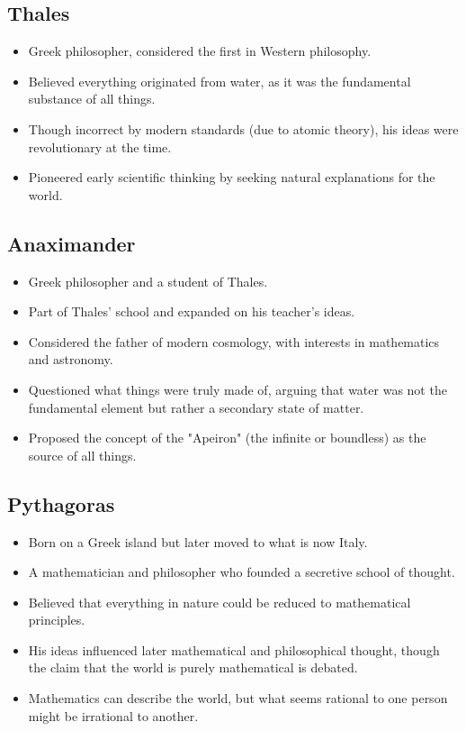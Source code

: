 
\subsection{Thales}

\begin{itemize}
    \item Greek philosopher, considered the first in Western philosophy.
    \item Believed everything originated from water, as it was the fundamental substance of all things.
    \item Though incorrect by modern standards (due to atomic theory), his ideas were revolutionary at the time.
    \item Pioneered early scientific thinking by seeking natural explanations for the world.
\end{itemize}

\subsection{Anaximander}

\begin{itemize}
    \item Greek philosopher and a student of Thales.
    \item Part of Thales' school and expanded on his teacher’s ideas.
    \item Considered the father of modern cosmology, with interests in mathematics and astronomy.
    \item Questioned what things were truly made of, arguing that water was not the fundamental element but rather a secondary state of matter.
    \item Proposed the concept of the "Apeiron" (the infinite or boundless) as the source of all things.
\end{itemize}

\subsection{Pythagoras}

\begin{itemize}
    \item Born on a Greek island but later moved to what is now Italy.
    \item A mathematician and philosopher who founded a secretive school of thought.
    \item Believed that everything in nature could be reduced to mathematical principles.
    \item His ideas influenced later mathematical and philosophical thought, though the claim that the world is purely mathematical is debated.
    \item Mathematics can describe the world, but what seems rational to one person might be irrational to another.
\end{itemize}

